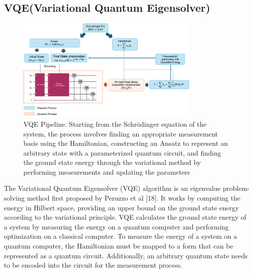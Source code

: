 \documentclass[pdflatex,sn-mathphys-num]{sn-jnl}%
\theoremstyle{thmstyleone}%
\theoremstyle{thmstyletwo}%
\theoremstyle{thmstylethree}%
\begin{document}
\subsection{VQE(Variational Quantum Eigensolver)}\label{subsec2.2}
\begin{figure}[htbp]
\centering
\includegraphics[width=0.8\textwidth]{fig/VQE_pipeline.png}
\caption{VQE Pipeline. Starting from the Schrödinger equation of the system, the process involves finding an appropriate measurement basis using the Hamiltonian, constructing an Ansatz to represent an arbitrary state with a parameterized quantum circuit, and finding the ground state energy through the variational method by performing measurements and updating the parameters}\label{Fig.2}
\end{figure}
The Variational Quantum Eigensolver (VQE) algorithm is an eigenvalue problem-solving method first proposed by Peruzzo et al [18]. 
It works by computing the energy in Hilbert space, providing an upper bound on the ground state energy according to the variational principle. 
VQE calculates the ground state energy of a system by measuring the energy on a quantum computer and performing optimization on a classical computer. 
To measure the energy of a system on a quantum computer, the Hamiltonian must be mapped to a form that can be represented as a quantum circuit. 
Additionally, an arbitrary quantum state needs to be encoded into the circuit for the measurement process.
\end{document}

